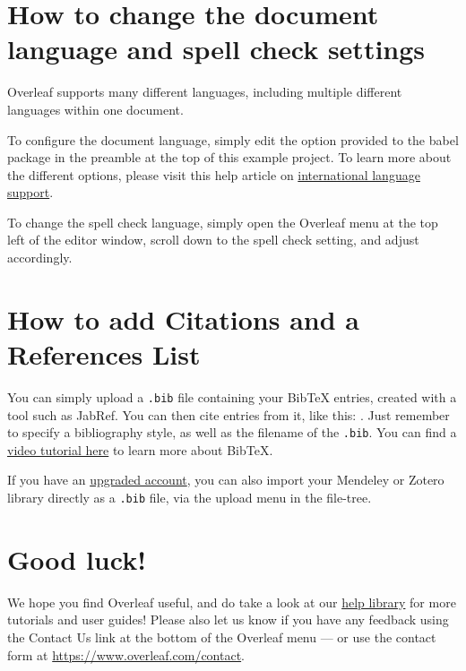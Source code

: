 \documentclass[a4paper,12pt]{scrreprt}
\begin{document}
\section{How to change the document language and spell check settings}

Overleaf supports many different languages, including multiple different languages within one document. 

To configure the document language, simply edit the option provided to the babel package in the preamble at the top of this example project. To learn more about the different options, please visit this help article on \href{https://www.overleaf.com/learn/latex/International_language_support}{international language support}.

To change the spell check language, simply open the Overleaf menu at the top left of the editor window, scroll down to the spell check setting, and adjust accordingly.

\section{How to add Citations and a References List}

You can simply upload a \verb|.bib| file containing your BibTeX entries, created with a tool such as JabRef. You can then cite entries from it, like this: \cite{greenwade93}. Just remember to specify a bibliography style, as well as the filename of the \verb|.bib|. You can find a \href{https://www.overleaf.com/help/97-how-to-include-a-bibliography-using-bibtex}{video tutorial here} to learn more about BibTeX.

If you have an \href{https://www.overleaf.com/user/subscription/plans}{upgraded account}, you can also import your Mendeley or Zotero library directly as a \verb|.bib| file, via the upload menu in the file-tree.

\section{Good luck!}

We hope you find Overleaf useful, and do take a look at our \href{https://www.overleaf.com/learn}{help library} for more tutorials and user guides! Please also let us know if you have any feedback using the Contact Us link at the bottom of the Overleaf menu --- or use the contact form at \url{https://www.overleaf.com/contact}.



\end{document}
